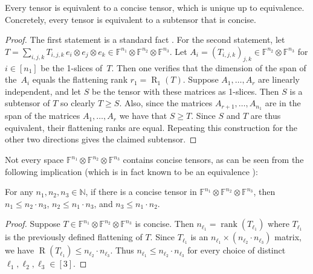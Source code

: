 \documentclass[11pt]{article}
\DeclareMathOperator{\tensorrank}{R}
\newcommand{\FF}{\mathbb{F}}
\newcommand{\NN}{\mathbb{N}}
\DeclareMathOperator{\rank}{rank} \DeclareMathOperator{\col}{colspan}
\begin{document}
\begin{lemma}\label{lem:equiv-concise}
    Every tensor is equivalent to a concise tensor, which is unique up to equivalence. Concretely, every tensor is equivalent to a subtensor that is concise.
\end{lemma}
\begin{proof}
    The first statement is a standard fact \cite[Section 14.3]{burgisser1997algebraic}. For the second statement, let $T = \sum_{i,j,k} T_{i,j,k}\, e_i \otimes e_j \otimes e_k \in \FF^{n_1} \otimes \FF^{n_2} \otimes \FF^{n_3}$. Let $A_i = (T_{i,j,k})_{j,k} \in \FF^{n_2} \otimes \FF^{n_3}$ for $i \in [n_1]$ be the 1-slices of~$T$. Then one verifies that the dimension of the span of the~$A_i$ equals the flattening rank $r_1=\tensorrank_1(T)$. Suppose $A_1, \ldots, A_r$ are linearly independent, and let $S$ be the tensor with these matrices as 1-slices. Then $S$ is a subtensor of $T$ so clearly $T \geq S$. Also, since the matrices $A_{r+1}, \ldots, A_{n_1}$ are in the span of the matrices $A_1, \ldots, A_r$ we have that $S \geq T$. Since $S$ and $T$ are thus equivalent, their flattening ranks are equal. Repeating this construction for the other two directions gives the claimed subtensor.
\end{proof}

Not every space $\FF^{n_1} \otimes \FF^{n_2} \otimes \FF^{n_3}$ contains concise tensors, as can be seen from the following implication (which is in fact known to be an equivalence \cite[Theorem~2]{MR2776439}):

\begin{lemma}\label{cl:concise-formats}
For any $n_1,n_2,n_3\in\NN$, if there is a concise tensor in $\FF^{n_1} \otimes \FF^{n_2} \otimes \FF^{n_3}$, then $n_1 \leq n_2\cdot n_3$, $n_2 \leq n_1\cdot n_3$, and $n_3 \leq n_1\cdot n_2$.
\end{lemma}
\begin{proof}
    Suppose $T \in \FF^{n_1} \otimes \FF^{n_2} \otimes \FF^{n_3}$ is concise. Then $n_{\ell_1} = \rank(T_{\ell_1})$ where $T_{\ell_1}$ is the previously defined flattening of $T$. Since $T_{\ell_1}$ is an $n_{\ell_1} \times (n_{\ell_2}\cdot n_{\ell_3})$ matrix, we have $\tensorrank(T_{\ell_1}) \leq n_{\ell_2} \cdot n_{\ell_3}$. Thus $n_{\ell_1} \leq n_{\ell_2} \cdot n_{\ell_3}$ for every choice of distinct ${\ell_1},{\ell_2},{\ell_3} \in [3]$.
\end{proof}
%
%
%
%
\end{document}
